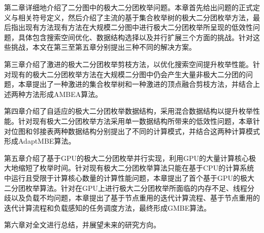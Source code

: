 第二章详细地介绍了二分图中的极大二分团枚举问题。本章首先给出问题的正式定义与相关符号定义，然后介绍了主流的基于集合枚举树的极大二分团枚举方法，最后指出现有方法现有方法在大规模二分图中进行极大二分团枚举所呈现的低效性问题，具体包含搜索空间优化、数据结构选择以及并行扩展三个方面的挑战。针对这些挑战，本文在第三至第五章分别提出三种不同的解决方案。

第三章介绍了激进的极大二分团枚举剪枝方法，以优化搜索空间提升枚举性能。针对现有的极大二分团枚举方法在大规模二分图中仍会产生大量非极大二分团的问题，本章提出了一种激进的集合枚举树和一种激进的顶点融合剪枝方法，并结合上述两种方法形成AMBEA算法。%

第四章介绍了自适应的极大二分团枚举数据结构，采用混合数据结构以提升枚举性能。针对现有极大二分团枚举方法采用单一数据结构所带来的低效性问题，本章针对位图和邻接表两种数据结构分别提出了不同的计算模式，并结合这两种计算模式形成AdaptMBE算法。%

第五章介绍了基于GPU的极大二分团枚举并行实现，利用GPU的大量计算核心极大地缩短了枚举时间。针对现有极大二分团枚举算法只能在基于CPU的计算系统中运行且受限于计算核心数量的计算性能问题，本章提出了首个基于GPU的极大二分团枚举算法。针对在GPU上进行极大二分团枚举所面临的内存不足、线程分歧以及负载不均问题，本章提出了基于节点重用的迭代计算流程、基于节点重用的迭代计算流程和负载感知的任务调度方法，最终形成GMBE算法。%

第六章对全文进行总结，并展望未来的研究方向。



